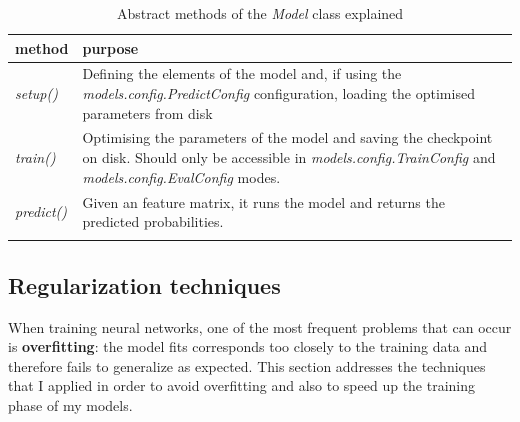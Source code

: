 	\begin{longtable}{p{}p{}}
		\textbf{method} & \textbf{purpose} \\
		\hline
		\textit{setup()} & Defining the elements of the model and, if using the \textit{models.config.PredictConfig} configuration, loading the optimised parameters from disk \\
		\hline
		\textit{train()} & Optimising the parameters of the model and saving the checkpoint on disk. Should only be accessible in \textit{models.config.TrainConfig} and \textit{models.config.EvalConfig} modes. \\
		\hline
		\textit{predict()} & Given an feature matrix, it runs the model and returns the predicted probabilities. \\
		\hline
		\caption{Abstract methods of the \textit{Model} class explained}
		\label{Table: impl/ml/model/purpose}
	\end{longtable}
	\subsection{Regularization techniques} \label{Section: impl/ml/reg}
	When training neural networks, one of the most frequent problems that can occur is \textbf{overfitting}: the model fits corresponds too closely to the training data and therefore fails to generalize as expected. This section addresses the techniques that I applied in order to avoid overfitting and also to speed up the training phase of my models.  
